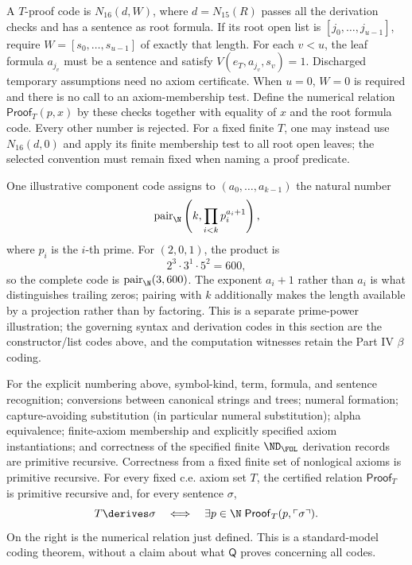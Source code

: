 A \(T\)-proof code is \(N_{16}(d,W)\), where \(d=N_{15}(R)\)
passes all the derivation checks and has a sentence as root formula.
If its root open list is \([j_0,\ldots,j_{u-1}]\), require
\(W=[s_0,\ldots,s_{u-1}]\) of exactly that length.  For each \(v<u\),
the leaf formula \(a_{j_v}\) must be a sentence and satisfy
\(V(e_T,a_{j_v},s_v)=1\).  Discharged temporary assumptions need no
axiom certificate.  When \(u=0\), \(W=0\) is required and there is
no call to an axiom-membership test.  Define the numerical relation
\(\mathsf{Proof}_T(p,x)\) by these checks together with equality of
\(x\) and the root formula code.  Every other number is rejected.
For a fixed finite \(T\), one may instead use \(N_{16}(d,0)\) and
apply its finite membership test to all root open leaves; the selected
convention must remain fixed when naming a proof predicate.

\begin{example}
One illustrative component code assigns to
\((a_0,\ldots,a_{k-1})\) the natural number
\[
  \operatorname{pair}_{\N}\left(k,\prod_{i<k}p_i^{a_i+1}\right),
\]
where \(p_i\) is the \(i\)-th prime.  For \((2,0,1)\), the product is
\[
  2^3\cdot3^1\cdot5^2=600,
\]
so the complete code is \(\operatorname{pair}_{\N}(3,600)\).  The
exponent \(a_i+1\) rather than \(a_i\) is what distinguishes trailing
zeros; pairing with \(k\) additionally makes the length available by a
projection rather than by factoring.  This is a separate prime-power
illustration; the governing syntax and derivation codes in this section
are the constructor/list codes above, and the computation witnesses retain
the Part IV \(\beta\) coding.
\end{example}

\begin{theorem}
For the explicit numbering above, symbol-kind, term, formula, and sentence
recognition; conversions between canonical strings and trees; numeral
formation; capture-avoiding substitution (in particular numeral
substitution); alpha equivalence; finite-axiom membership and explicitly
specified axiom instantiations; and correctness of the specified finite
\(\ND_{\FOL}\) derivation records are primitive recursive.  Correctness
from a fixed finite set of nonlogical axioms is primitive recursive.
For every fixed c.e. axiom set \(T\), the certified relation
\(\mathsf{Proof}_T\) is primitive recursive and, for every sentence
\(\sigma\),
\[
 T\derives\sigma
 \quad\Longleftrightarrow\quad
 \exists p\in\N\;\mathsf{Proof}_T(p,\ulcorner\sigma\urcorner).
\]
On the right is the numerical relation just defined.  This is a
standard-model coding theorem, without a claim about what \(\mathsf Q\)
proves concerning all codes.
\end{theorem}

